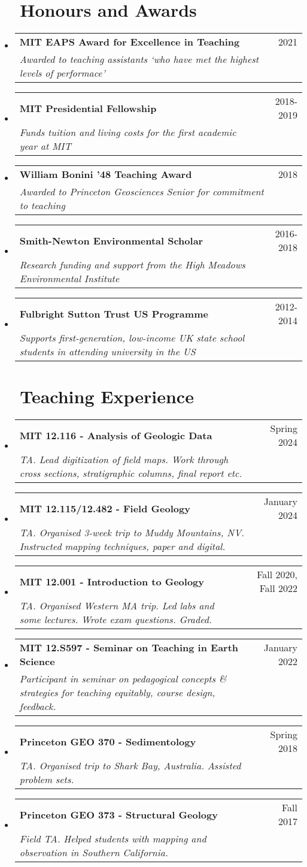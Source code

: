 \documentclass[letterpaper,20pt]{article}
\makeatletter
\newcommand{\resumeSubheading}[4]{
  \vspace{-1pt}\item
    \begin{tabular*}{0.97\textwidth}{l@{\extracolsep{\fill}}r}
      \textbf{#1} & #2 \\
      \textit{#3} & \textit{#4} \\
    \end{tabular*}\vspace{-5pt}
}
\newcommand{\resumeSubHeadingListStart}{\begin{itemize}[leftmargin=*]}
\newcommand{\resumeSubHeadingListEnd}{\end{itemize}}
\makeatother
\begin{document}
\vspace{3pt}
\section{~~Honours and Awards}
  \resumeSubHeadingListStart
  \resumeSubheading
    {MIT EAPS Award for Excellence in Teaching}{2021}
    {Awarded to teaching assistants `who have met the highest levels of performace'}{}    
   \resumeSubheading
    {MIT Presidential Fellowship}{2018-2019}
    {Funds tuition and living costs for the first academic year at MIT}{}    
  \resumeSubheading
    {William Bonini '48 Teaching Award}{2018}
    {Awarded to Princeton Geosciences Senior for commitment to teaching}{}
  \resumeSubheading
    {Smith-Newton Environmental Scholar}{2016-2018}
    {Research funding and support from the High Meadows Environmental Institute}{}  
  \resumeSubheading
    {Fulbright Sutton Trust US Programme}{2012-2014}
    {Supports first-generation, low-income UK state school students in attending university in the US}{}
    \resumeSubHeadingListEnd
    
\vspace{3pt}
\section{~~Teaching Experience}
  \resumeSubHeadingListStart
    \resumeSubheading
    {MIT 12.116 - Analysis of Geologic Data}{Spring 2024}
    {TA. Lead digitization of field maps. Work through cross sections, stratigraphic columns, final report etc.}{} 
    \resumeSubheading
    {MIT 12.115/12.482 - Field Geology}{January 2024}
    {TA. Organised 3-week trip to Muddy Mountains, NV. Instructed mapping techniques, paper and digital.}{} 
    \resumeSubheading
    {MIT 12.001 - Introduction to Geology}{Fall 2020, Fall 2022}
    {TA. Organised Western MA trip. Led labs and some lectures. Wrote exam questions. Graded.}{} 
    \resumeSubheading
    {MIT 12.S597 - Seminar on Teaching in Earth Science}{January 2022}
    {Participant in seminar on pedagogical concepts \& strategies for teaching equitably, course design, feedback.}{}
  \resumeSubheading
    {Princeton GEO 370 - Sedimentology}{Spring 2018}
    {TA. Organised trip to Shark Bay, Australia. Assisted problem sets.}{} 
  \resumeSubheading
    {Princeton GEO 373 - Structural Geology}{Fall 2017}
    {Field TA. Helped students with mapping and observation in Southern California.}{} 
    \resumeSubHeadingListEnd


\vspace{3pt}
\end{document}
